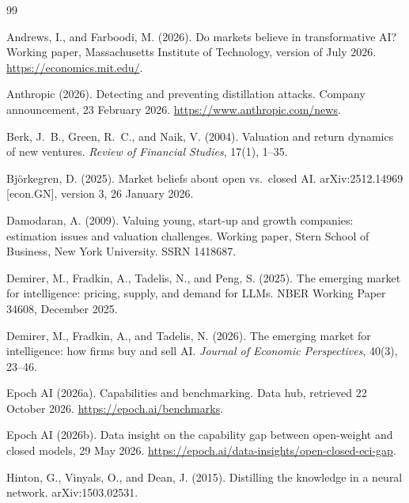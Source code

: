 \documentclass[12pt]{article}
\begin{document}
\begin{thebibliography}{99}
\setlength{\itemsep}{2pt}
\small

Andrews, I., and Farboodi, M. (2026). Do markets believe in transformative AI? Working paper, Massachusetts Institute of Technology, version of July 2026. \url{https://economics.mit.edu/}.

Anthropic (2026). Detecting and preventing distillation attacks. Company announcement, 23 February 2026. \url{https://www.anthropic.com/news}.

Berk, J.~B., Green, R.~C., and Naik, V. (2004). Valuation and return dynamics of new ventures. \textit{Review of Financial Studies}, 17(1), 1--35.

Bj\"orkegren, D. (2025). Market beliefs about open vs.\ closed AI. arXiv:2512.14969 [econ.GN], version 3, 26 January 2026.

Damodaran, A. (2009). Valuing young, start-up and growth companies: estimation issues and valuation challenges. Working paper, Stern School of Business, New York University. SSRN 1418687.

Demirer, M., Fradkin, A., Tadelis, N., and Peng, S. (2025). The emerging market for intelligence: pricing, supply, and demand for LLMs. NBER Working Paper 34608, December 2025.

Demirer, M., Fradkin, A., and Tadelis, N. (2026). The emerging market for intelligence: how firms buy and sell AI. \textit{Journal of Economic Perspectives}, 40(3), 23--46.

Epoch AI (2026a). Capabilities and benchmarking. Data hub, retrieved 22 October 2026. \url{https://epoch.ai/benchmarks}.

Epoch AI (2026b). Data insight on the capability gap between open-weight and closed models, 29 May 2026. \url{https://epoch.ai/data-insights/open-closed-eci-gap}.

Hinton, G., Vinyals, O., and Dean, J. (2015). Distilling the knowledge in a neural network. arXiv:1503.02531.


\end{thebibliography}
\end{document}
